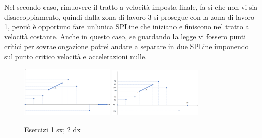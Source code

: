 Nel secondo caso, rimuovere il tratto a velocità imposta finale, fa sì che non vi sia disaccoppiamento, quindi dalla zona di lavoro 3 si prosegue con la zona di lavoro 1, perciò è opportuno fare un'unica SPLine che iniziano e finiscono nel tratto a velocità costante. Anche in questo caso, se guardando la legge vi fossero punti critici per sovraelongazione potrei andare a separare in due SPLine imponendo sul punto critico velocità e accelerazioni nulle.

\begin{figure}[h]
    \centering
    \includegraphics[width=0.4\textwidth]{Immagini/es1_leggi_moto.png}
    \includegraphics[width=0.4\textwidth]{Immagini/es2_leggi_moto.png}
    \caption{Esercizi 1 sx; 2 dx}
\end{figure}